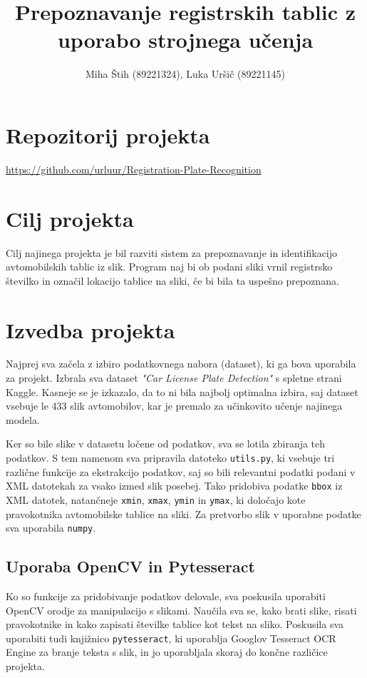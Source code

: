 \documentclass[a4paper,12pt]{article}
\title{Prepoznavanje registrskih tablic z uporabo strojnega učenja}
\author{Miha Štih (89221324), Luka Uršič (89221145)}
\date{}
\begin{document}
\maketitle

\section*{Repozitorij projekta}
\url{https://github.com/urluur/Registration-Plate-Recognition}

\section*{Cilj projekta}
Cilj najinega projekta je bil razviti sistem za prepoznavanje in identifikacijo avtomobilskih tablic iz slik. Program naj bi ob podani sliki vrnil registrsko številko in označil lokacijo tablice na sliki, če bi bila ta uspešno prepoznana.

\section*{Izvedba projekta}
Najprej sva začela z izbiro podatkovnega nabora (dataset), ki ga bova uporabila za projekt. Izbrala sva dataset \textit{"Car License Plate Detection"} s spletne strani Kaggle. Kasneje se je izkazalo, da to ni bila najbolj optimalna izbira, saj dataset vsebuje le 433 slik avtomobilov, kar je premalo za učinkovito učenje najinega modela.

Ker so bile slike v datasetu ločene od podatkov, sva se lotila zbiranja teh podatkov. S tem namenom sva pripravila datoteko \texttt{utils.py}, ki vsebuje tri različne funkcije za ekstrakcijo podatkov, saj so bili relevantni podatki podani v XML datotekah za vsako izmed slik posebej. Tako pridobiva podatke \texttt{bbox} iz XML datotek, natančneje \texttt{xmin}, \texttt{xmax}, \texttt{ymin} in \texttt{ymax}, ki določajo kote pravokotnika avtomobilske tablice na sliki. Za pretvorbo slik v uporabne podatke sva uporabila \texttt{numpy}.

\subsection*{Uporaba OpenCV in Pytesseract}
Ko so funkcije za pridobivanje podatkov delovale, sva poskusila uporabiti OpenCV orodje za manipulacijo s slikami. Naučila sva se, kako brati slike, risati pravokotnike in kako zapisati številke tablice kot tekst na sliko. Poskusila sva uporabiti tudi knjižnico \texttt{pytesseract}, ki uporablja Googlov Tesseract OCR Engine za branje teksta s slik, in jo uporabljala skoraj do končne različice projekta.
\end{document}
